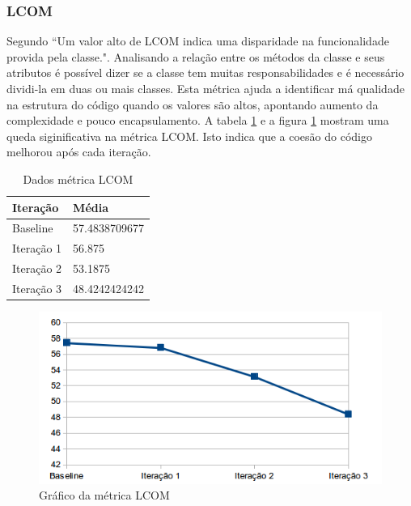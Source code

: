 \documentclass[conference]{IEEEtran}
\begin{document}
\subsubsection{LCOM}

Segundo \cite{cksuite} ``Um valor alto de LCOM indica uma disparidade na
funcionalidade provida pela classe.". Analisando a relação entre os métodos da
classe e seus atributos é possível dizer se a classe tem muitas
responsabilidades e é necessário dividi-la em duas ou mais classes. Esta métrica
ajuda a identificar má qualidade na estrutura do código quando os valores são
altos, apontando aumento da complexidade e pouco encapsulamento. A tabela
\ref{tab:lcom} e a figura \ref{fig:lcom} mostram uma queda siginificativa na
métrica LCOM. Isto indica que a coesão do código melhorou após cada iteração.

\begin{table}[!h]
	\centering
	    \caption{\label{tab:lcom} Dados métrica LCOM}
    \begin{tabular}{ | l | l | }
    \hline
    Iteração & Média 			\\ \hline
    Baseline & 57.4838709677   	\\ \hline
    Iteração 1 & 56.875			\\ \hline
	Iteração 2 & 53.1875		\\ \hline
	Iteração 3 & 48.4242424242	\\ \hline
    \end{tabular}
    
\end{table}

\begin{figure}[!htb]
	\begin{center}
		\includegraphics[scale=0.7]{img/lcom.png}
	\end{center}
	\caption{\label{fig:lcom} Gráfico da métrica LCOM}   
	
\end{figure}
\end{document}
